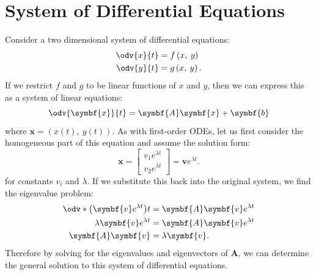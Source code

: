 \documentclass{article}
\begin{document}
\section{System of Differential Equations}
Consider a two dimensional system of differential equations:
\begin{align*}
    \odv{x}{t} & = f\left( x,\: y \right)  \\
    \odv{y}{t} & = g\left( x,\: y \right).
\end{align*}
If we restrict \(f\) and \(g\) to be linear functions of \(x\) and \(y\),
then we can express this as a system of linear equations:
\begin{equation*}
    \odv{\symbf{x}}{t} = \symbf{A} \symbf{x} + \symbf{b}
\end{equation*}
where \(\symbf{x} = \left( x\left( t \right),\: y\left( t \right) \right)\).
As with first-order ODEs, let us first consider the homogeneous part of
this equation and assume the solution form:
\begin{equation*}
    \symbf{x} =
    \begin{bmatrix}
        v_1 e^{\lambda t} \\
        v_2 e^{\lambda t}
    \end{bmatrix}
    = \symbf{v} e^{\lambda t}.
\end{equation*}
for constants \(v_i\) and \(\lambda\). If we substitute this back into
the original system, we find the eigenvalue problem:
\begin{align*}
    \odv*{\left( \symbf{v} e^{\lambda t} \right)}{t} & = \symbf{A} \symbf{v} e^{\lambda t} \\
    \lambda \symbf{v} e^{\lambda t}                  & = \symbf{A} \symbf{v} e^{\lambda t} \\
    \symbf{A} \symbf{v}                              & = \lambda \symbf{v}.
\end{align*}
Therefore by solving for the eigenvalues and eigenvectors of \(\symbf{A}\),
we can determine the general solution to this system of differential
equations.
\end{document}
